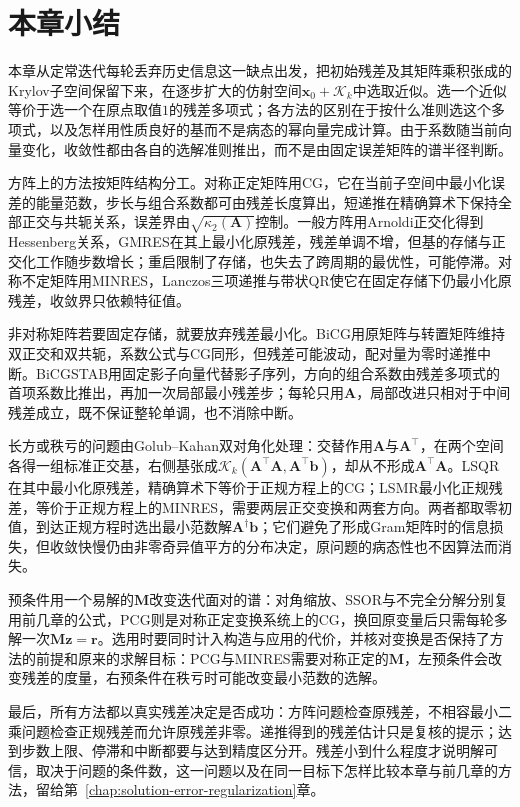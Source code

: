 \FloatBarrier
\section{本章小结}
\label{sec:krylov-methods-summary}

本章从定常迭代每轮丢弃历史信息这一缺点出发，把初始残差及其矩阵乘积张成的Krylov子空间保留下来，在逐步扩大的仿射空间$\bm x_0+\mathcal K_k$中选取近似。选一个近似等价于选一个在原点取值$1$的残差多项式；各方法的区别在于按什么准则选这个多项式，以及怎样用性质良好的基而不是病态的幂向量完成计算。由于系数随当前向量变化，收敛性都由各自的选解准则推出，而不是由固定误差矩阵的谱半径判断。

方阵上的方法按矩阵结构分工。对称正定矩阵用CG，它在当前子空间中最小化误差的能量范数，步长与组合系数都可由残差长度算出，短递推在精确算术下保持全部正交与共轭关系，误差界由$\sqrt{\kappa_2(\bm A)}$控制。一般方阵用Arnoldi正交化得到Hessenberg关系，GMRES在其上最小化原残差，残差单调不增，但基的存储与正交化工作随步数增长；重启限制了存储，也失去了跨周期的最优性，可能停滞。对称不定矩阵用MINRES，Lanczos三项递推与带状QR使它在固定存储下仍最小化原残差，收敛界只依赖特征值。

非对称矩阵若要固定存储，就要放弃残差最小化。BiCG用原矩阵与转置矩阵维持双正交和双共轭，系数公式与CG同形，但残差可能波动，配对量为零时递推中断。BiCGSTAB用固定影子向量代替影子序列，方向的组合系数由残差多项式的首项系数比推出，再加一次局部最小残差步；每轮只用$\bm A$，局部改进只相对于中间残差成立，既不保证整轮单调，也不消除中断。

长方或秩亏的问题由Golub--Kahan双对角化处理：交替作用$\bm A$与$\bm A^\top$，在两个空间各得一组标准正交基，右侧基张成$\mathcal K_k(\bm A^\top\bm A,\bm A^\top\bm b)$，却从不形成$\bm A^\top\bm A$。LSQR在其中最小化原残差，精确算术下等价于正规方程上的CG；LSMR最小化正规残差，等价于正规方程上的MINRES，需要两层正交变换和两套方向。两者都取零初值，到达正规方程时选出最小范数解$\bm A^\dagger\bm b$；它们避免了形成Gram矩阵时的信息损失，但收敛快慢仍由非零奇异值平方的分布决定，原问题的病态性也不因算法而消失。

预条件用一个易解的$\bm M$改变迭代面对的谱：对角缩放、SSOR与不完全分解分别复用前几章的公式，PCG则是对称正定变换系统上的CG，换回原变量后只需每轮多解一次$\bm M\bm z=\bm r$。选用时要同时计入构造与应用的代价，并核对变换是否保持了方法的前提和原来的求解目标：PCG与MINRES需要对称正定的$\bm M$，左预条件会改变残差的度量，右预条件在秩亏时可能改变最小范数的选解。

最后，所有方法都以真实残差决定是否成功：方阵问题检查原残差，不相容最小二乘问题检查正规残差而允许原残差非零。递推得到的残差估计只是复核的提示；达到步数上限、停滞和中断都要与达到精度区分开。残差小到什么程度才说明解可信，取决于问题的条件数，这一问题以及在同一目标下怎样比较本章与前几章的方法，留给第~\ref{chap:solution-error-regularization}章。
